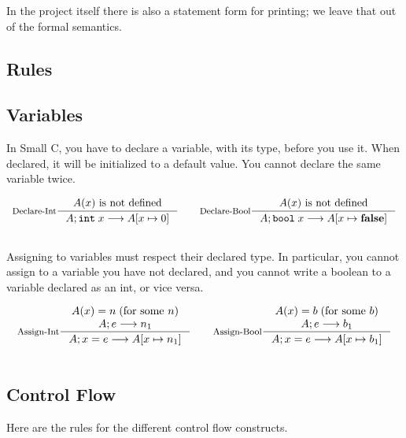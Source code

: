 \documentclass[10pt]{article}
\begin{document}
In the project itself there is also a statement form for printing; we
leave that out of the formal semantics.

\subsection{Rules}

\subsection*{Variables}

In Small C, you have to declare a variable, with its type, before you
use it. When declared, it will be initialized to a default value. You
cannot declare the same variable twice.

$$
\begin{array}{c}

\inference[Declare-Int]
{A(x) \mathrm{~is~not~defined}}
{\config{\mathtt{int}\;x} --> A[ x \mapsto 0 ]}

\qquad

\inference[Declare-Bool]
{A(x) \mathrm{~is~not~defined}}
{\config{\mathtt{bool}\;x} --> A[ x \mapsto \mathbf{false} ]} \\ \\
\end{array}
$$

Assigning to variables must respect their declared type. In
particular, you cannot assign to a variable you have not declared, and
you cannot write a boolean to a variable declared as an int, or vice versa.

$$
\begin{array}{c}

\inference[Assign-Int]
{A(x) = n\;\mathrm{(for~some~}n)\\
\config{e} --> n_1}
{\config{x=e} --> A[ x \mapsto n_1 ]}
\qquad

\inference[Assign-Bool]
{A(x) = b\;\mathrm{(for~some~}b)\\
\config{e} --> b_1}
{\config{x=e} --> A[ x \mapsto b_1 ]} \\ \\

\end{array}
$$

\subsection*{Control Flow} Here are the rules for the different
control flow constructs.
\end{document}
